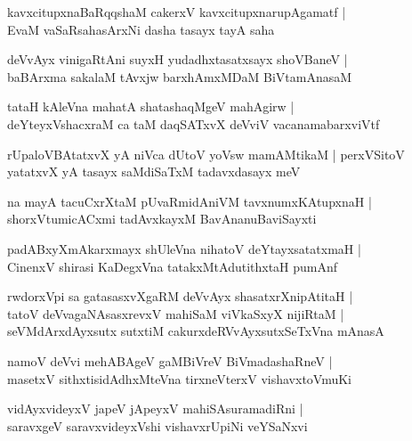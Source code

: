 \begin{shloka}
kavxcitupxnaBaRqqshaM cakerxV kavxcitupxnarupAgamatf |\\
EvaM vaSaRsahasArxNi dasha tasayx tayA saha
\end{shloka}

\begin{shloka}
deVvAyx vinigaRtAni suyxH yudadhxtasatxsayx shoVBaneV |\\
baBArxma sakalaM tAvxjw barxhAmxMDaM BiVtamAnasaM 
\end{shloka}

\begin{shloka}
tataH kAleVna mahatA shatashaqMgeV mahAgirw |\\
deYteyxVshacxraM ca taM daqSATxvX deVviV vacanamabarxviVtf
\end{shloka}

\begin{shloka}
rUpaloVBAtatxvX yA niVca dUtoV yoVsw mamAMtikaM |
perxVSitoV yatatxvX yA tasayx saMdiSaTxM tadavxdasayx meV 
\end{shloka}

\begin{shloka}
na mayA tacuCxrXtaM pUvaRmidAniVM tavxnumxKAtupxnaH |\\
shorxVtumicACxmi tadAvxkayxM BavAnanuBaviSayxti
\end{shloka}

\begin{shloka}
padABxyXmAkarxmayx shUleVna nihatoV deYtayxsatatxmaH |\\
CinenxV shirasi KaDegxVna tatakxMtAdutithxtaH pumAnf 
\end{shloka}

\begin{shloka}
rwdorxVpi sa gatasasxvXgaRM deVvAyx shasatxrXnipAtitaH |\\
tatoV deVvagaNAsasxrevxV mahiSaM viVkaSxyX nijiRtaM |\\
seVMdArxdAyxsutx sutxtiM cakurxdeRVvAyxsutxSeTxVna mAnasA
\end{shloka}

\begin{shloka}
namoV deVvi mehABAgeV gaMBiVreV BiVmadashaRneV |\\
masetxV sithxtisidAdhxMteVna tirxneVterxV vishavxtoVmuKi
\end{shloka}

\begin{shloka}
vidAyxvideyxV japeV jApeyxV mahiSAsuramadiRni |\\
saravxgeV saravxvideyxVshi vishavxrUpiNi veYSaNxvi
\end{shloka}

